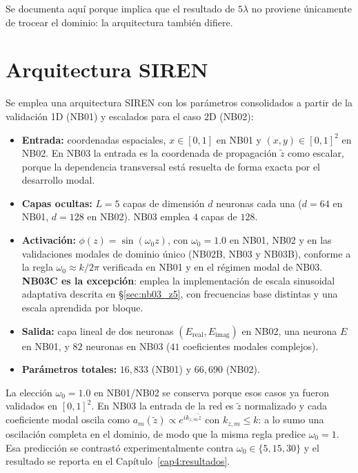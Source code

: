 Se documenta aquí porque implica que el resultado de $5\lambda$ no proviene
únicamente de trocear el dominio: la arquitectura también difiere.

\section{Arquitectura SIREN}
\label{sec:arquitectura_siren}

Se emplea una arquitectura SIREN con los parámetros consolidados a partir de la
validación 1D (NB01) y escalados para el caso 2D (NB02):

\begin{itemize}
    \item \textbf{Entrada:} coordenadas espaciales, $x\in[0,1]$ en NB01 y
    $(x,y)\in[0,1]^2$ en NB02. En NB03 la entrada es la coordenada de
    propagación $\tilde z$ como escalar, porque la dependencia transversal está
    resuelta de forma exacta por el desarrollo modal.
    \item \textbf{Capas ocultas:} $L = 5$ capas de dimensión $d$ neuronas cada
    una ($d = 64$ en NB01, $d = 128$ en NB02). NB03 emplea $4$ capas de $128$.
    \item \textbf{Activación:} $\phi(z) = \sin(\omega_0 z)$, con
    $\omega_0=1.0$ en NB01, NB02 y en las validaciones modales de dominio único
    (NB02B, NB03 y NB03B), conforme a la regla $\omega_0\approx k/2\pi$
    verificada en NB01 y en el régimen modal de NB03. \textbf{NB03C es la
    excepción}: emplea la implementación de escala sinusoidal adaptativa
    descrita en §\ref{sec:nb03_z5}, con frecuencias base distintas y una escala
    aprendida por bloque.
    \item \textbf{Salida:} capa lineal de dos neuronas $(E_\text{real}, E_\text{imag})$
    en NB02, una neurona $E$ en NB01, y $82$ neuronas en NB03
    ($41$ coeficientes modales complejos).
    \item \textbf{Parámetros totales:} $16{,}833$ (NB01) y $66{,}690$ (NB02).
\end{itemize}

La elección $\omega_0 = 1.0$ en NB01/NB02 se conserva porque esos casos ya
fueron validados en $[0,1]^2$. En NB03 la entrada de la red es $\tilde z$
normalizado y cada coeficiente modal oscila como
$a_m(\tilde z)\propto e^{i k_{z,m}\tilde z}$ con $k_{z,m}\leq k$: a lo sumo una
oscilación completa en el dominio, de modo que la misma regla predice
$\omega_0=1$. Esa predicción se contrastó experimentalmente contra
$\omega_0\in\{5,15,30\}$ y el resultado se reporta en el
Capítulo~\ref{cap4:resultados}.

